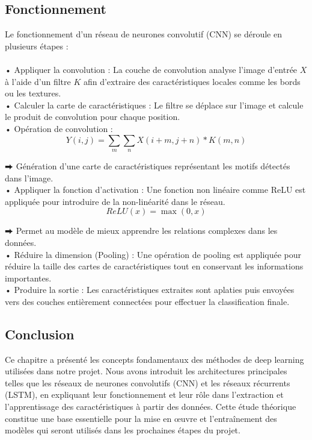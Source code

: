 \subsection{Fonctionnement}
Le fonctionnement d’un réseau de neurones convolutif (CNN) se déroule en plusieurs étapes :
\\
\\
• Appliquer la convolution : La couche de convolution analyse l’image d’entrée \(X\) à l’aide d’un filtre \(K\) afin d’extraire des caractéristiques locales comme les bords ou les textures.
\\
• Calculer la carte de caractéristiques : Le filtre se déplace sur l’image et calcule le produit de convolution pour chaque position.
\\
• Opération de convolution : 
\[
Y(i,j) = \sum_{m}\sum_{n} X(i+m, j+n) \ast K(m,n)
\]

\noindent
⮕ Génération d’une carte de caractéristiques représentant les motifs détectés dans l’image.
\\
• Appliquer la fonction d’activation : Une fonction non linéaire comme ReLU est appliquée pour introduire de la non-linéarité dans le réseau.
\\
\[
ReLU(x) = \max(0,x)
\]

\noindent
⮕ Permet au modèle de mieux apprendre les relations complexes dans les données.
\\
• Réduire la dimension (Pooling) : Une opération de pooling est appliquée pour réduire la taille des cartes de caractéristiques tout en conservant les informations importantes.
\\
• Produire la sortie : Les caractéristiques extraites sont aplaties puis envoyées vers des couches entièrement connectées pour effectuer la classification finale.
\subsection{Conclusion}
Ce chapitre a présenté les concepts fondamentaux des méthodes de deep learning
utilisées dans notre projet. Nous avons introduit les architectures principales telles
que les réseaux de neurones convolutifs (CNN) et les réseaux récurrents (LSTM),
en expliquant leur fonctionnement et leur rôle dans l’extraction et l’apprentissage
des caractéristiques à partir des données. Cette étude théorique constitue une base
essentielle pour la mise en œuvre et l’entraînement des modèles qui seront utilisés
dans les prochaines étapes du projet.

